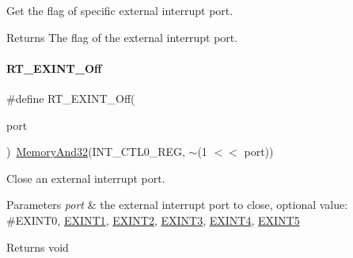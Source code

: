 Get the flag of specific external interrupt port. 

\begin{DoxyReturn}{Returns}
The flag of the external interrupt port. 
\end{DoxyReturn}
\mbox{\label{a00011_aa1a62e0954243f0c0fc8ec850ea2eebe}} 
\paragraph{\texorpdfstring{R\+T\+\_\+\+E\+X\+I\+N\+T\+\_\+\+Off}{RT\_EXINT\_Off}}
{\footnotesize\ttfamily \#define R\+T\+\_\+\+E\+X\+I\+N\+T\+\_\+\+Off(\begin{DoxyParamCaption}\item[{}]{port }\end{DoxyParamCaption})~\mbox{\hyperlink{a00020_ad87cedffcaadc51db22594fce55173d4}{Memory\+And32}}(I\+N\+T\+\_\+\+C\+T\+L0\+\_\+\+R\+EG, $\sim$(1 $<$$<$ port))}



Close an external interrupt port. 


\begin{DoxyParams}{Parameters}
{\em port} & the external interrupt port to close, optional value\+: \#\+E\+X\+I\+N\+T0, \mbox{\hyperlink{a00011_af11f5754cc92430795a63bb53d964cd4a6c87103fd7c63fc99ee4b631c0a4dac4}{E\+X\+I\+N\+T1}}, \mbox{\hyperlink{a00011_af11f5754cc92430795a63bb53d964cd4a92c5398067978d1aefd4ba3c276dec32}{E\+X\+I\+N\+T2}}, \mbox{\hyperlink{a00011_af11f5754cc92430795a63bb53d964cd4a3c37ddaa34bf4297b421d8577be06895}{E\+X\+I\+N\+T3}}, \mbox{\hyperlink{a00011_af11f5754cc92430795a63bb53d964cd4a766aca243fc0f7aa292c791202bef6e7}{E\+X\+I\+N\+T4}}, \mbox{\hyperlink{a00011_af11f5754cc92430795a63bb53d964cd4af59c814bf9818345f24bb79e7533945c}{E\+X\+I\+N\+T5}} \\
\hline
\end{DoxyParams}
\begin{DoxyReturn}{Returns}
void 
\end{DoxyReturn}
\mbox{\label{a00011_a135ec6dd65a4ef971477debf65c6809f}} 
